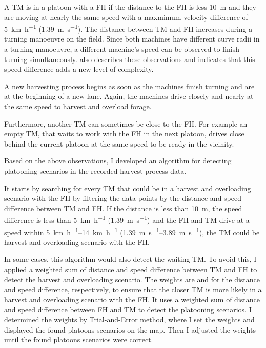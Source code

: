 A \ac{TM} is in a platoon with a \ac{FH} if the distance to the \ac{FH} is less \SI{10}{\metre} and they are moving at
nearly the same speed with a maxmimum
velocity difference of \SI{5}{\km\per\hour} (\SI{1.39}{\metre\per\second}).
The distance between \ac{TM} and \ac{FH} increases during a turning manoeuvre on the field.
Since both machines have different curve radii in a turning manoeuvre, a different machine's speed can be observed to
finish turning simultaneously.
\textcite{smolnik_5g_2020} also describes these observations and indicates that this speed difference adds a new
level of complexity.

A new harvesting process begins as soon as the machines finish turning and are at the beginning of a new lane.
Again, the machines drive closely and nearly at the same speed to harvest and overload forage.

Furthermore, another \ac{TM} can sometimes be close to the \ac{FH}.
For example an empty TM, that waits to work with the \ac{FH} in the next platoon, drives close behind the current
platoon at the same speed to be ready in the vicinity.

Based on the above observations, I developed an algorithm for detecting platooning scenarios in the recorded harvest process data.

It starts by searching for every \ac{TM} that could be in a harvest and overloading scenario with the \ac{FH} by filtering
the data points by the distance and speed difference between \ac{TM} and \ac{FH}.
If the distance is less than \SI{10}{\metre}, the speed difference is less than \SI{5}{\km\per\hour}
(\SI{1.39}{\metre\per\second}) and the \ac{FH} and \ac{TM} drive at a speed within \SIrange{5}{14}{\km\per\hour}
(\SIrange{1.39}{3.89}{\metre\per\second}), the \ac{TM} could be harvest and overloading scenario with the \ac{FH}.

In some cases, this algorithm would also detect the waiting \ac{TM}.
To avoid this, I applied a weighted sum of distance and speed difference
between \ac{TM} and \ac{FH} to detect the harvest and overloading scenario.
The weights are  and  for the distance and speed difference, respectively, to ensure that
the closer \ac{TM} is more likely in a harvest and overloading scenario with the \ac{FH}.
It uses a weighted sum of distance and speed difference between \ac{FH} and \ac{TM} to detect the platooning scenarios.
I determined the weights by Trial-and-Error  method, where I set the weights and displayed
the found platoons scenarios on the map. Then I adjusted the weights until the found platoons scenarios were correct.

